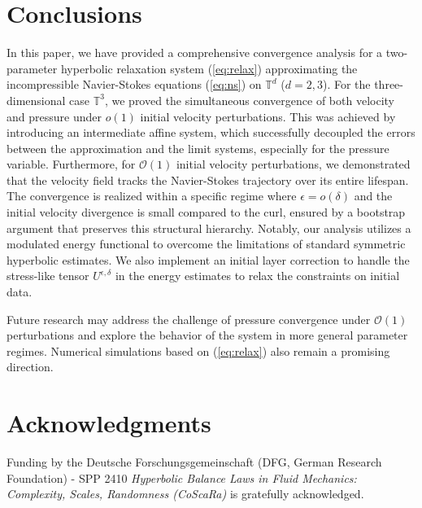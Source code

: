 \documentclass[reqno,10pt]{amsart}
\theoremstyle{definition}
\theoremstyle{remark}
\numberwithin{equation}{section}
\begin{document}
\section{Conclusions} \label{sec:concl}

In this paper, we have provided a comprehensive convergence analysis for a two-parameter hyperbolic relaxation system (\ref{eq:relax}) approximating the incompressible Navier-Stokes equations (\ref{eq:ns}) on $\mathbb{T}^d$ ($d=2,3$). For the three-dimensional case $\mathbb T^3$, we proved the simultaneous convergence of both velocity and pressure under $o(1)$ initial velocity perturbations. This was achieved by introducing an intermediate affine system, which successfully decoupled the errors between the approximation and the limit systems, especially for the pressure variable. Furthermore, for $\mathcal O(1)$ initial velocity perturbations, we demonstrated that the velocity field tracks the Navier-Stokes trajectory over its entire lifespan. The convergence is realized within a specific regime where $\epsilon = o(\delta)$ and the initial velocity divergence is small compared to the curl, ensured by a bootstrap argument that preserves this structural hierarchy. Notably, our analysis utilizes a modulated energy functional to overcome the limitations of standard symmetric hyperbolic estimates. We also implement an initial layer correction to handle the stress-like tensor $U^{\epsilon,\delta}$ in the energy estimates to relax the constraints on initial data.

Future research may address the challenge of pressure convergence under $\mathcal O(1)$ perturbations and explore the behavior of the system in more general parameter regimes. Numerical simulations based on (\ref{eq:relax}) also remain a promising direction.

\section*{Acknowledgments}
Funding by the Deutsche Forschungsgemeinschaft (DFG, German Research Foundation) - SPP 2410 \textit{Hyperbolic Balance Laws in Fluid Mechanics: Complexity, Scales, Randomness (CoScaRa)} is gratefully acknowledged.



\end{document}
